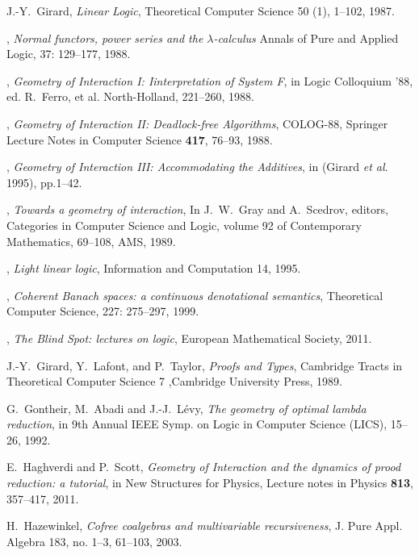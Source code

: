 \documentclass[english,letter paper,12pt,reqno]{article}
\theoremstyle{example}
\numberwithin{equation}{section}
\begin{document}
\begin{thebibliography}{BHLS03}
J.-Y.~Girard, \textsl{Linear Logic}, Theoretical Computer Science 50 (1), 1--102, 1987.

\bysame, \textsl{Normal functors, power series and the $\lambda$-calculus} Annals of Pure and Applied
Logic, 37: 129--177, 1988.

\bysame, \textsl{Geometry of {I}nteraction I: {I}interpretation of {S}ystem {F}}, in Logic Colloquium '88, ed. R.~Ferro, et al. North-Holland, 221--260, 1988.

\bysame, \textsl{Geometry of {I}nteraction II: {D}eadlock-free {A}lgorithms}, COLOG-88, Springer Lecture Notes in Computer Science \textbf{417}, 76--93, 1988.

\bysame, \textsl{Geometry of {I}nteraction III: {A}ccommodating the {A}dditives}, in (Girard \textsl{et al}. 1995), pp.1--42.

\bysame, \textsl{Towards a geometry of interaction}, In J.~W.~Gray and A.~Scedrov, editors, Categories in Computer Science and Logic, volume 92 of Contemporary Mathematics, 69--108, AMS, 1989.

\bysame, \textsl{Light linear logic}, Information and Computation 14, 1995.

\bysame, \textsl{Coherent {B}anach spaces: a continuous denotational semantics}, Theoretical Computer Science, 227: 275--297, 1999.

\bysame, \textsl{The Blind Spot: lectures on logic}, European Mathematical Society, 2011.

J.-Y.~Girard, Y.~Lafont, and P.~Taylor, \textsl{Proofs and Types}, Cambridge Tracts in Theoretical Computer Science 7 ,Cambridge University Press, 1989.

G.~Gontheir, M.~Abadi and J.-J.~L\'{e}vy, \textsl{The geometry of optimal lambda reduction}, in 9th Annual IEEE Symp. on Logic in Computer Science (LICS), 15--26, 1992.
  
E.~Haghverdi and P.~Scott, \textsl{Geometry of {I}nteraction and the dynamics of prood reduction: a tutorial}, in New Structures for Physics, Lecture notes in Physics \textbf{813}, 357--417, 2011.
  
H.~Hazewinkel, \textsl{Cofree coalgebras and multivariable recursiveness}, J. Pure Appl. Algebra 183, no. 1--3, 61--103, 2003.


\end{thebibliography}
\end{document}

